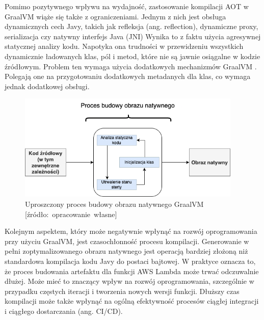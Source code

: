 Pomimo pozytywnego wpływu na wydajność, zastosowanie kompilacji AOT w GraalVM wiąże się także z ograniczeniami.
Jednym z nich jest obsługa dynamicznych cech Javy, takich jak refleksja (ang. reflection), dynamiczne proxy, serializacja czy natywny interfejs Java (JNI)
Wynika to z faktu użycia agresywnej statycznej analizy kodu.
Napotyka ona trudności w przewidzeniu wszystkich dynamicznie ładowanych klas, pól i metod, które nie są jawnie osiągalne w kodzie źródłowym.
Problem ten wymaga użycia dodatkowych mechanizmów GraalVM \cite{graalvm-reflection-jdk21}.
Polegają one na przygotowaniu dodatkowych metadanych dla klas, co wymaga jednak dodatkowej obsługi.

\begin{figure}
    \centering
    \includegraphics[width=0.95\textwidth]{charts/graalvm-build-process.drawio.png}
    \caption{Uproszczony proces budowy obrazu natywnego GraalVM [źródło:~opracowanie~własne]}
    \label{fig:graalvm_build_process}
\end{figure}

Kolejnym aspektem, który może negatywnie wpłynąć na rozwój oprogramowania przy użyciu GraalVM, jest czasochłonność procesu kompilacji.
Generowanie w pełni zoptymalizowanego obrazu natywnego jest operacją bardziej złożoną niż standardowa kompilacja kodu Javy do postaci bajtowej.
W praktyce oznacza to, że proces budowania artefaktu dla funkcji AWS Lambda może trwać odczuwalnie dłużej.
Może mieć to znaczący wpływ na rozwój oprogramowania, szczególnie w przypadku częstych iteracji i tworzenia nowych wersji funkcji.
Dłuższy czas kompilacji może także wpłynąć na ogólną efektywność procesów ciągłej integracji i ciągłego dostarczania (ang. CI/CD).

